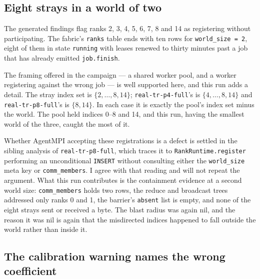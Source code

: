 \documentclass[11pt]{article}
\begin{document}
\subsection*{Eight strays in a world of two}

The generated findings flag ranks 2, 3, 4, 5, 6, 7, 8 and 14 as registering without
participating. The fabric's \texttt{ranks} table ends with ten rows for
\texttt{world\_size = 2}, eight of them in state \texttt{running} with leases renewed to thirty
minutes past a job that has already emitted \texttt{job.finish}.

The framing offered in the campaign --- a shared worker pool, and a worker registering against
the wrong job --- is well supported here, and this run adds a detail. The stray index set is
$\{2,\ldots,8,14\}$; \texttt{real-tr-p4-full}'s is $\{4,\ldots,8,14\}$ and
\texttt{real-tr-p8-full}'s is $\{8,14\}$. In each case it is exactly the pool's index set minus
the world. The pool held indices 0--8 and 14, and this run, having the smallest world of the
three, caught the most of it.

Whether AgentMPI accepting these registrations is a defect is settled in the sibling analysis of
\texttt{real-tr-p8-full}, which traces it to \texttt{RankRuntime.register} performing an
unconditional \texttt{INSERT} without consulting either the \texttt{world\_size} meta key or
\texttt{comm\_members}. I agree with that reading and will not repeat the argument. What this run
contributes is the containment evidence at a second world size: \texttt{comm\_members} holds two
rows, the reduce and broadcast trees addressed only ranks 0 and 1, the barrier's \texttt{absent}
list is empty, and none of the eight strays sent or received a byte. The blast radius was again
nil, and the reason it was nil is again that the misdirected indices happened to fall outside the
world rather than inside it.

\subsection*{The calibration warning names the wrong coefficient}
\end{document}
